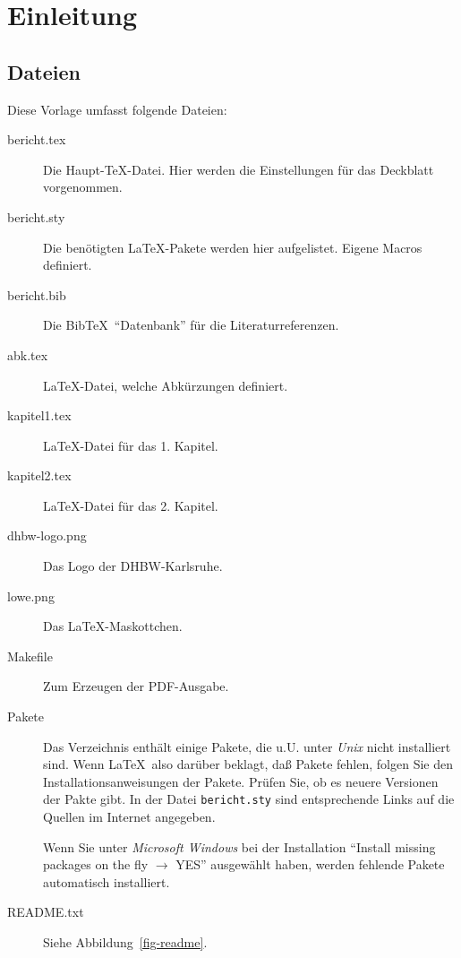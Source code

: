 
\chapter{Einleitung}

\section{Dateien}
Diese Vorlage umfasst folgende Dateien:
\begin{description}
\item[bericht.tex] Die Haupt-\TeX-Datei. Hier werden die Einstellungen für das
     Deckblatt vorgenommen.
\item[bericht.sty] Die benötigten \LaTeX-Pakete werden hier aufgelistet. Eigene Macros definiert.
\item[bericht.bib] Die Bib\TeX\ "`Datenbank"' für die Literaturreferenzen.
\item[abk.tex] \LaTeX-Datei, welche Abkürzungen definiert.
\item[kapitel1.tex] \LaTeX-Datei für das 1. Kapitel.
\item[kapitel2.tex] \LaTeX-Datei für das 2. Kapitel.
\item[dhbw-logo.png] Das Logo der DHBW-Karlsruhe.
\item[lowe.png] Das \LaTeX-Maskottchen.
\item[Makefile] Zum Erzeugen der PDF-Ausgabe.
\item[Pakete] Das Verzeichnis enthält einige Pakete, die u.U. unter \emph{Unix} nicht installiert
     sind. Wenn \LaTeX\ also darüber beklagt, daß Pakete fehlen, folgen Sie den Installationsanweisungen
     der Pakete. Prüfen Sie, ob es neuere Versionen der Pakte gibt. In der Datei
     \texttt{bericht.sty} sind entsprechende Links auf die Quellen im Internet angegeben.

     Wenn Sie unter \emph{Microsoft Windows} bei der Installation
     \enquote{Install missing packages on the fly $\longrightarrow$ YES} ausgewählt haben,
     werden fehlende Pakete automatisch installiert.
\item[README.txt] Siehe Abbildung~\ref{fig-readme}.
\end{description}

